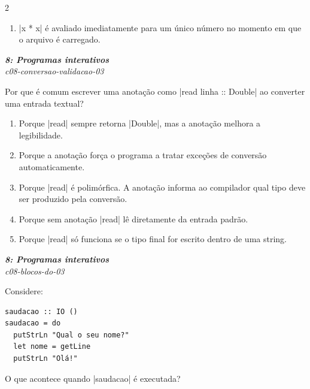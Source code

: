 \documentclass[a4paper,10pt,brazil]{article}
\begin{document}
\begin{multicols}{2}
\begin{enumerate}
  \item \haskellinline|x * x| é avaliado imediatamente para um único número no momento em que o arquivo é carregado.


\end{enumerate}

\begin{flushright}
  \footnotesize
  \textit{\textbf{8: Programas interativos}}\\
  \textit{c08-conversao-validacao-03}\\

\end{flushright}
Por que é comum escrever uma anotação como \haskellinline|read linha :: Double| ao converter uma entrada textual?

\begin{enumerate}
  \item Porque \haskellinline|read| sempre retorna \haskellinline|Double|, mas a anotação melhora a legibilidade.

  \item Porque a anotação força o programa a tratar exceções de conversão automaticamente.

  \item Porque \haskellinline|read| é polimórfica. A anotação informa ao compilador qual tipo deve ser produzido pela conversão.

  \item Porque sem anotação \haskellinline|read| lê diretamente da entrada padrão.

  \item Porque \haskellinline|read| só funciona se o tipo final for escrito dentro de uma string.


\end{enumerate}

\begin{flushright}
  \footnotesize
  \textit{\textbf{8: Programas interativos}}\\
  \textit{c08-blocos-do-03}\\

\end{flushright}
Considere:

\begin{verbatim}
saudacao :: IO ()
saudacao = do
  putStrLn "Qual o seu nome?"
  let nome = getLine
  putStrLn "Olá!"
\end{verbatim}

O que acontece quando \haskellinline|saudacao| é executada?


\end{multicols}
\end{document}
